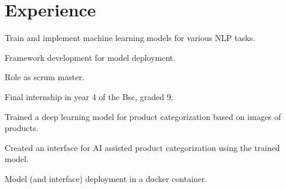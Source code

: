 \documentclass[a4paper]{deedy-resume} %
\begin{document}
\begin{minipage}[t]{0.62\textwidth} %




\section{Experience}


\vspace{\topsep} %

\begin{tightitemize}
\item Train and implement machine learning models for various NLP tasks.
\item Framework development for model deployment.
\item Role as scrum master.
\end{tightitemize}

\sectionspace %





\begin{tightitemize}
\item Final internship in year 4 of the Bsc, graded 9.
\item Trained a deep learning model for product categorization based on images of products.
\item Created an interface for AI assisted product categorization using the trained model.
\item Model (and interface) deployment in a docker container.
\end{tightitemize}

\sectionspace %





\end{minipage}
\end{document}
